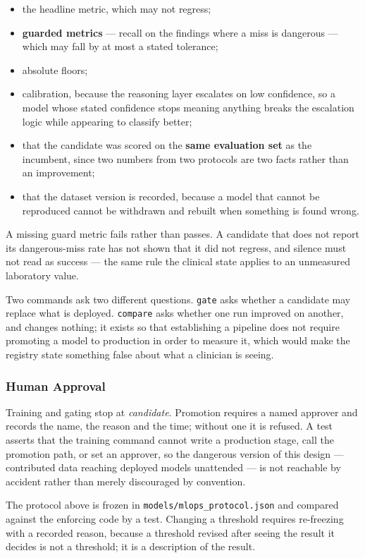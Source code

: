 \begin{itemize}
  \item the headline metric, which may not regress;
  \item \textbf{guarded metrics} --- recall on the findings where a miss is dangerous ---
        which may fall by at most a stated tolerance;
  \item absolute floors;
  \item calibration, because the reasoning layer escalates on low confidence, so a model whose
        stated confidence stops meaning anything breaks the escalation logic while appearing
        to classify better;
  \item that the candidate was scored on the \textbf{same evaluation set} as the incumbent,
        since two numbers from two protocols are two facts rather than an improvement;
  \item that the dataset version is recorded, because a model that cannot be reproduced cannot
        be withdrawn and rebuilt when something is found wrong.
\end{itemize}

A missing guard metric fails rather than passes. A candidate that does not report its
dangerous-miss rate has not shown that it did not regress, and silence must not read as
success --- the same rule the clinical state applies to an unmeasured laboratory value.

Two commands ask two different questions. \texttt{gate} asks whether a candidate may replace
what is deployed. \texttt{compare} asks whether one run improved on another, and changes
nothing; it exists so that establishing a pipeline does not require promoting a model to
production in order to measure it, which would make the registry state something false about
what a clinician is seeing.

\subsubsection{Human Approval}

Training and gating stop at \emph{candidate}. Promotion requires a named approver and records
the name, the reason and the time; without one it is refused. A test asserts that the training
command cannot write a production stage, call the promotion path, or set an approver, so the
dangerous version of this design --- contributed data reaching deployed models unattended ---
is not reachable by accident rather than merely discouraged by convention.

The protocol above is frozen in \texttt{models/mlops\_protocol.json} and compared against the
enforcing code by a test. Changing a threshold requires re-freezing with a recorded reason,
because a threshold revised after seeing the result it decides is not a threshold; it is a
description of the result.
